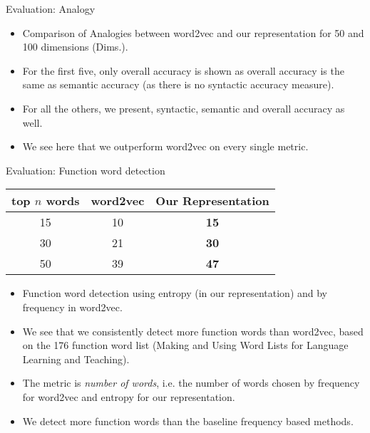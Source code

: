 \documentclass[8pt]{beamer}
\begin{document}
\begin{frame}{Evaluation: Analogy}
\begin{itemize}
\item Comparison of Analogies between word2vec and our representation for 50 and 100 dimensions (Dims.).
\item For the first five, only overall accuracy is shown as overall accuracy is the same as semantic accuracy (as there is no syntactic accuracy measure).
\item For all the others, we present, syntactic, semantic and overall accuracy as well. 
\item We see here that we outperform word2vec on every single metric.
\end{itemize}
\end{frame}


\begin{frame}{Evaluation: Function word detection}
    \begin{tabular}{c|cc}
        top $n$ words & \bf word2vec & \bf Our Representation  \\ \hline
        15  & 10 & \bf 15 \\
        30  & 21 & \bf 30 \\
        50  & 39 & \bf 47  \\
    \end{tabular}

\begin{itemize}
\item Function word detection using entropy (in our representation) and by frequency in word2vec.
\item We see that we consistently detect more function words than word2vec, based on the 176 function word list (Making and Using Word Lists for Language Learning and Teaching).
\item The metric is \emph{number of words}, i.e. the number of words chosen by frequency for word2vec and entropy for our representation.
\item We detect more function words than the baseline frequency based methods. 
\end{itemize}
\end{frame}
\end{document}
